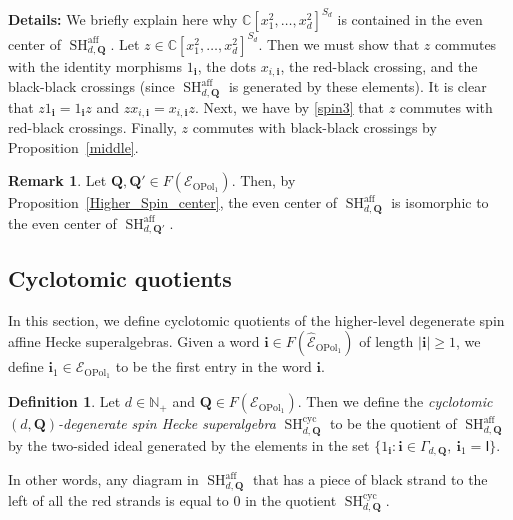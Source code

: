 \documentclass[11pt]{amsart}
\newcommand{\details}[1]{
      \ \\
      {\color{OliveGreen}
        \textbf{Details:} #1
      }
      \\
  }
\newcommand{\details}[1]{}
\newcommand\go{\mathsf{I}}              %
\theoremstyle{definition}
\newtheorem{defn}[theo]{Definition}
\newtheorem{rmk}[theo]{Remark}
\numberwithin{equation}{section}
\begin{document}
\details{We briefly explain here why $ \mathbb{C}[x_{1}^{2},\ldots,x_{d}^{2}]^{S_{d}} $ is contained in the even center of $ \operatorname{SH}^{\operatorname{aff}}_{d,\mathbf{Q}} $. Let $ z \in \mathbb{C}[x_{1}^{2},\ldots,x_{d}^{2}]^{S_{d}} $. Then we must show that $ z $ commutes with the identity morphisms $ 1_{\mathbf{i}} $, the dots $ x_{i,\mathbf{i}} $, the red-black crossing, and the black-black crossings (since $ \operatorname{SH}^{\operatorname{aff}}_{d,\mathbf{Q}} $ is generated by these elements). It is clear that $ z1_{\mathbf{i}} = 1_{\mathbf{i}}z $ and $ zx_{i,\mathbf{i}} = x_{i,\mathbf{i}}z $. Next, we have by \cref{spin3} that \(z\) commutes with red-black crossings. Finally, \(z\) commutes with black-black crossings by Proposition~\ref{middle}.}

\begin{rmk}
Let $ \mathbf{Q}, \mathbf{Q}' \in F(\mathcal{E}_{\operatorname{OPol}_{1}}) $. Then, by Proposition~\ref{Higher_Spin_center}, the even center of $ \operatorname{SH}^{\operatorname{aff}}_{d,\mathbf{Q}} $ is isomorphic to the even center of $ \operatorname{SH}^{\operatorname{aff}}_{d,\mathbf{Q}'} $.
\end{rmk}

\subsection{Cyclotomic quotients} \label{Cyclotomic_quotients}

In this section, we define cyclotomic quotients of the higher-level degenerate spin affine Hecke superalgebras. Given a word $ \mathbf{i} \in F(\widehat{\mathcal{E}}_{\operatorname{OPol}_{1}}) $ of length $ |\mathbf{i}| \geq 1 $, we define $ \mathbf{i}_{1} \in \widehat{\mathcal{E}}_{\operatorname{OPol}_{1}} $ to be the first entry in the word $ \mathbf{i} $.


\begin{defn} \label{spin_cyclotomic_quotient}
Let $ d \in \mathbb{N}_{+} $ and $ \mathbf{Q} \in F(\mathcal{E}_{\operatorname{OPol}_{1}}) $. Then we define the \emph{cyclotomic $ (d,\mathbf{Q}) $-degenerate spin Hecke superalgebra} $ \operatorname{SH}^{\operatorname{cyc}}_{d,\mathbf{Q}} $ to be the quotient of $ \operatorname{SH}^{\operatorname{aff}}_{d,\mathbf{Q}} $ by the two-sided ideal generated by the elements in the set $ \{1_{\mathbf{i}} : \mathbf{i} \in \Gamma_{d,\mathbf{Q}}, \ \mathbf{i}_{1} = \go \} $.
\end{defn}

In other words, any diagram in $ \operatorname{SH}^{\operatorname{aff}}_{d,\mathbf{Q}} $ that has a piece of black strand to the left of all the red strands is equal to \(0\) in the quotient $ \operatorname{SH}^{\operatorname{cyc}}_{d,\mathbf{Q}} $. 
\end{document}
